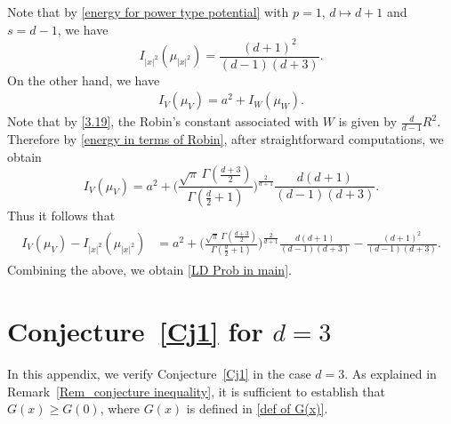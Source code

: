 \documentclass[10pt]{amsart}
\theoremstyle{plain}
\theoremstyle{remark}
\numberwithin{equation}{section}
\begin{document}
Note that by \eqref{energy for power type potential} with $p=1$, $d \mapsto d+1$ and $s=d-1$, we have 
\begin{equation}
I_{ |x|^2 }(\mu_{|x|^2}) = \frac{(d+1)^2}{(d-1)(d+3)}. 
\end{equation} 
On the other hand, we have 
\begin{align*}
I_V(\mu_V)  = a^2+I_W(\mu_W). 
\end{align*}
Note that by \eqref{3.19}, the Robin's constant associated with $W$ is given by $\frac{d}{d-1}R^2$. Therefore by \eqref{energy in terms of Robin}, after straightforward computations, we obtain
\begin{equation}
I_V(\mu_V)= a^2+ \Big( \frac{ \sqrt{\pi} \, \Gamma(\frac{d+3}{2})   }{ \Gamma(\frac{d}{2}+1)  } \Big)^{ \frac{2}{d+1} }\frac{d(d+1)}{(d-1)(d+3)}. 
\end{equation}
Thus it follows that 
\begin{align}
\begin{split}
I_V(\mu_V) - I_{ |x|^2 }(\mu_{|x|^2}) &= a^2+ \Big( \frac{ \sqrt{\pi} \, \Gamma(\frac{d+3}{2})   }{ \Gamma(\frac{d}{2}+1)  } \Big)^{ \frac{2}{d+1} }\frac{d(d+1)}{(d-1)(d+3)}-  \frac{(d+1)^2}{(d-1)(d+3)} . 
\end{split}
\end{align}
Combining the above, we obtain \eqref{LD Prob in main}. 
  
 





\appendix 

\section{Conjecture~\ref{Cj1} for $d=3$} \label{Appendix_d=3}
In this appendix, we verify Conjecture~\ref{Cj1} in the case \( d=3 \).
As explained in Remark~\ref{Rem_conjecture inequality}, it is sufficient to
establish that \( G(x) \ge G(0) \), where \( G(x) \) is defined in
\eqref{def of G(x)}.
 
\end{document}
